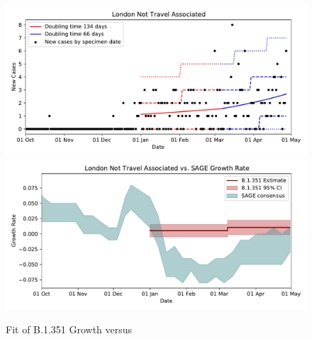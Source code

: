\documentclass[10pt,a4paper]{article}
\begin{document}
\begin{figure}
\centering
\includegraphics[width=1.0\textwidth]{../figures/voc_london_nta_fit.pdf}\\
\includegraphics[width=1.0\textwidth]{../figures/voc_london_nta_comp.pdf}\\
\caption{Fit of B.1.351 Growth versus }
\label{fig:voc_fit}
\end{figure}
\end{document}
